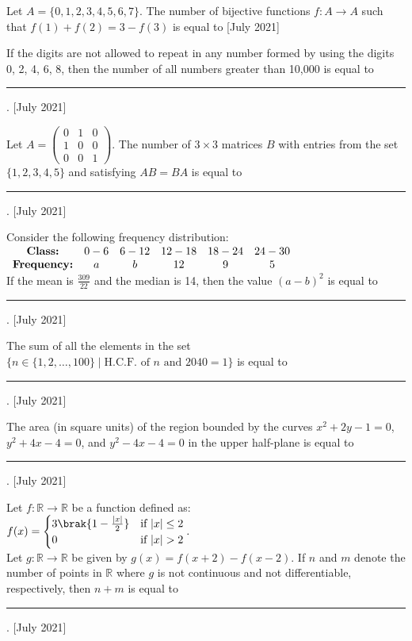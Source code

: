  \iffalse
 \title{2021}
 \author{AI24BTECH11012}
 \section{integer}
 \fi
 \item Let $ A = \{0, 1, 2, 3, 4, 5, 6, 7\} $. The number of bijective functions $ f : A \to A $ such that $ f(1) + f(2) = 3 - f(3) $ is equal to
 \hfill{[July 2021]}

    \item If the digits are not allowed to repeat in any number formed by using the digits 0, 2, 4, 6, 8, then the number of all numbers greater than 10,000 is equal to \rule{2.5cm}{0.4pt}.
    \hfill{[July 2021]}

    \item Let $A = 
    \begin{pmatrix}
    0 & 1 & 0 \\
    1 & 0 & 0 \\
    0 & 0 & 1
    \end{pmatrix}.
    $
    The number of $ 3 \times 3 $ matrices $ B $ with entries from the set $ \{1, 2, 3, 4, 5\} $ and satisfying $ AB = BA $ is equal to \rule{2.5cm}{0.4pt}.
    \hfill{[July 2021]}

    \item Consider the following frequency distribution:\\
    $ \begin{array}{c c c c c c c}
\text{\textbf{Class:}} & 0-6 & 6-12 & 12-18 & 18-24 & 24-30 \\
\text{\textbf{Frequency:}} & a & b & 12 & 9 & 5
\end{array}$\\
    If the mean is $ \frac{309}{22} $ and the median is 14, then the value $ (a - b)^2 $ is equal to \rule{2.5cm}{0.4pt}.
    \hfill{[July 2021]}

    \item The sum of all the elements in the set $ \{n \in \{1, 2, \ldots, 100\} \mid \text{H.C.F. of } n \text{ and } 2040 = 1 \} $ is equal to \rule{2.5cm}{0.4pt}.
\hfill{[July 2021]}
    \item The area (in square units) of the region bounded by the curves $ x^2 + 2y - 1 = 0 $, $ y^2 + 4x - 4 = 0 $, and $ y^2 - 4x - 4 = 0 $ in the upper half-plane is equal to \rule{2.5cm}{0.4pt}.
    \hfill{[July 2021]}

    \item Let $ f : \mathbb{R} \to \mathbb{R} $ be a function defined as:\\
    $
    f(x) =
    \begin{cases}
    3\brak{1-\frac{|x|}{2}} & \text{if } |x| \leq 2 \\
    0 & \text{if } |x| > 2
    \end{cases}.
    $\\
    Let $ g : \mathbb{R} \to \mathbb{R} $ be given by $ g(x) = f(x+2) - f(x-2) $. If $ n $ and $ m $ denote the number of points in $ \mathbb{R} $ where $ g $ is not continuous and not differentiable, respectively, then $ n + m $ is equal to \rule{2.5cm}{0.4pt}.
    \hfill{[July 2021]}

